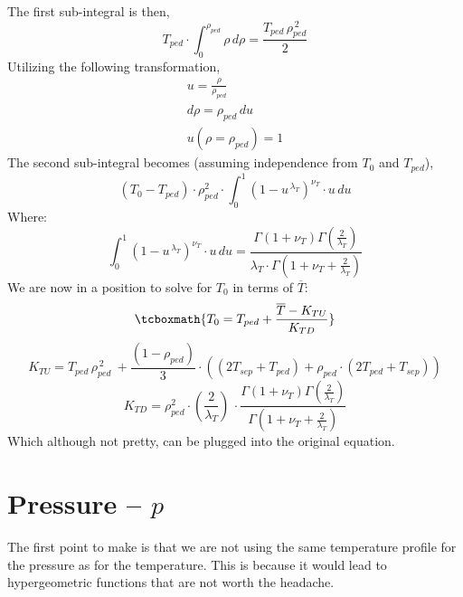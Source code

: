 The first sub-integral is then,
\begin{equation}
	T_{ped} \cdot \int_0^{\rho_{ped}} \rho \, d\rho = \frac{ T_{ped} \, \rho_{ped}^{\,2} }{2}
\end{equation}
Utilizing the following transformation,
\begin{gather}
	u = \frac{\rho}{\rho_{ped}} \\
	d\rho = \rho_{ped} \, du \\
	u( \rho=\rho_{ped} ) = 1
\end{gather}
The second sub-integral becomes (assuming independence from $T_0$ and $T_{ped}$),
\begin{equation}
	( T_{0} - T_{ped} ) \cdot \rho_{ped}^2 \cdot \int_0^{1} \left( 1 - u^{\,\lambda_T} \right)^{\nu_T}  \cdot u \, du
\end{equation}
Where:
\begin{equation}
	\int_0^{1} \left( 1 - u^{\,\lambda_T} \right)^{\nu_T}  \cdot u \, du =  \frac{ \Gamma \left( 1 + \nu_T  \right) \Gamma \left( \frac{2}{\lambda_T} \right) }{ \lambda_T \cdot \Gamma \left( 1 + \nu_T + \frac{2}{\lambda_T} \right) }
\end{equation}
We are now in a position to solve for $T_0$ in terms of $\overline{T}$:
\begin{equation}
	\tcboxmath{
	T_0 = T_{ped} + \frac{ \overline{T} - K_{TU} }{K_{TD}} }
\end{equation}
\begin{equation}
	K_{TU}  =  T_{ped} \, \rho_{ped}^{\,2}  \ +  \frac{ \left( 1 - \rho_{ped} \right ) }{3} \cdot \left( \left( 2 T_{sep} + T_{ped} \right) + \rho_{ped} \cdot \left( 2 T_{ped} + T_{sep}   \right)  \right)
\end{equation}
\begin{equation}
	K_{TD} = \rho_{ped}^2 \cdot \left( \frac{ 2 }{ \lambda_T } \right) \, \cdot \frac{ \Gamma \left( 1 + \nu_T  \right) \Gamma \left( \frac{2}{\lambda_T} \right) }{ \Gamma \left( 1 + \nu_T + \frac{2}{\lambda_T} \right) }
\end{equation}
Which although not pretty, can be plugged into the original equation.

\section{Pressure -- $p$}

The first point to make is that we are not using the same temperature profile for the pressure as for the temperature. This is because it would lead to hypergeometric functions that are not worth the headache.


